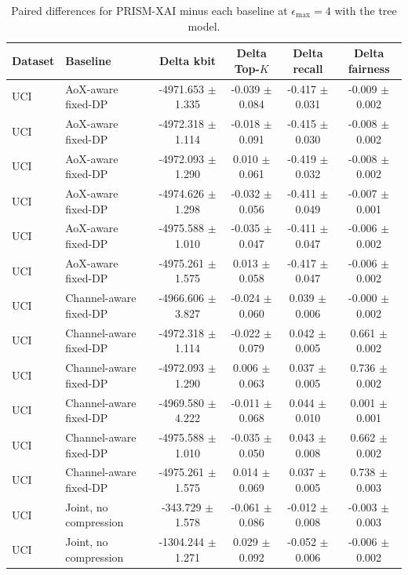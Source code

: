 \begin{table}[t]
\caption{Paired differences for PRISM-XAI minus each baseline at $\epsilon_{\max}=4$ with the tree model.}
\label{tab:paired-differences}
\centering
\scriptsize
\setlength{\tabcolsep}{3pt}
\begin{tabular}{llcccc}
\toprule
Dataset & Baseline & Delta kbit & Delta Top-$K$ & Delta recall & Delta fairness \\
\midrule
UCI & AoX-aware fixed-DP & -4971.653 $\pm$ 1.335 & -0.039 $\pm$ 0.084 & -0.417 $\pm$ 0.031 & -0.009 $\pm$ 0.002 \\
UCI & AoX-aware fixed-DP & -4972.318 $\pm$ 1.114 & -0.018 $\pm$ 0.091 & -0.415 $\pm$ 0.030 & -0.008 $\pm$ 0.002 \\
UCI & AoX-aware fixed-DP & -4972.093 $\pm$ 1.290 & 0.010 $\pm$ 0.061 & -0.419 $\pm$ 0.032 & -0.008 $\pm$ 0.002 \\
UCI & AoX-aware fixed-DP & -4974.626 $\pm$ 1.298 & -0.032 $\pm$ 0.056 & -0.411 $\pm$ 0.049 & -0.007 $\pm$ 0.001 \\
UCI & AoX-aware fixed-DP & -4975.588 $\pm$ 1.010 & -0.035 $\pm$ 0.047 & -0.411 $\pm$ 0.047 & -0.006 $\pm$ 0.002 \\
UCI & AoX-aware fixed-DP & -4975.261 $\pm$ 1.575 & 0.013 $\pm$ 0.058 & -0.417 $\pm$ 0.047 & -0.006 $\pm$ 0.002 \\
UCI & Channel-aware fixed-DP & -4966.606 $\pm$ 3.827 & -0.024 $\pm$ 0.060 & 0.039 $\pm$ 0.006 & -0.000 $\pm$ 0.002 \\
UCI & Channel-aware fixed-DP & -4972.318 $\pm$ 1.114 & -0.022 $\pm$ 0.079 & 0.042 $\pm$ 0.005 & 0.661 $\pm$ 0.002 \\
UCI & Channel-aware fixed-DP & -4972.093 $\pm$ 1.290 & 0.006 $\pm$ 0.063 & 0.037 $\pm$ 0.005 & 0.736 $\pm$ 0.002 \\
UCI & Channel-aware fixed-DP & -4969.580 $\pm$ 4.222 & -0.011 $\pm$ 0.068 & 0.044 $\pm$ 0.010 & 0.001 $\pm$ 0.001 \\
UCI & Channel-aware fixed-DP & -4975.588 $\pm$ 1.010 & -0.035 $\pm$ 0.050 & 0.043 $\pm$ 0.008 & 0.662 $\pm$ 0.002 \\
UCI & Channel-aware fixed-DP & -4975.261 $\pm$ 1.575 & 0.014 $\pm$ 0.069 & 0.037 $\pm$ 0.005 & 0.738 $\pm$ 0.003 \\
UCI & Joint, no compression & -343.729 $\pm$ 1.578 & -0.061 $\pm$ 0.086 & -0.012 $\pm$ 0.008 & -0.003 $\pm$ 0.003 \\
UCI & Joint, no compression & -1304.244 $\pm$ 1.271 & 0.029 $\pm$ 0.092 & -0.052 $\pm$ 0.006 & -0.006 $\pm$ 0.002 \\

\end{tabular}
\end{table}
